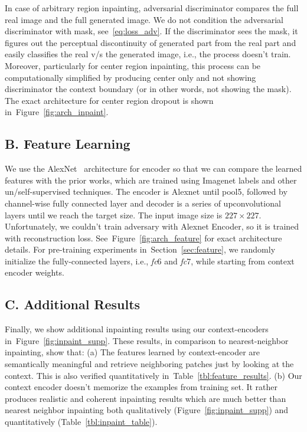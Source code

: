 \documentclass[10pt,twocolumn,letterpaper]{article}
\newcommand{\reffig}[1]{Figure~\ref{fig:#1}}
\newcommand{\refsec}[1]{Section~\ref{sec:#1}}
\newcommand{\reftbl}[1]{Table~\ref{tbl:#1}}
\begin{document}
In case of arbitrary region inpainting, adversarial discriminator compares the full real image and the full generated image. We do not condition the adversarial discriminator with mask, see~\eqref{eq:loss_adv}. If the discriminator sees the mask, it figures out the perceptual discontinuity of generated part from the real part and easily classifies the real v/s the generated image, i.e., the process doesn't train.
%
Moreover, particularly for center region inpainting, this process can be computationally simplified by producing center only and not showing discriminator the context boundary (or in other words, not showing the mask).
The exact architecture for center region dropout is shown in~\reffig{arch_inpaint}.

\subsection*{B. Feature Learning}
We use the AlexNet~\cite{krizhevsky2012imagenet} architecture for encoder so that we can compare the learned features with the prior works, which are trained using Imagenet labels and other un/self-supervised techniques.
The encoder is Alexnet until pool5, followed by channel-wise fully connected layer and decoder is a series of upconvolutional layers until we reach the target size.
The input image size is $227\times 227$.
Unfortunately, we couldn't train adversary with Alexnet Encoder, so it is trained with reconstruction loss.
See~\reffig{arch_feature} for exact architecture details.
For pre-training experiments in~\refsec{feature}, we randomly initialize the fully-connected layers, i.e., \textit{fc}6 and \textit{fc}7, while starting from context encoder weights.

\subsection*{C. Additional Results}
Finally, we show additional inpainting results using our context-encoders in~\reffig{inpaint_supp}.
These results, in comparison to nearest-neighbor inpainting, show that: (a) The features learned by context-encoder are semantically meaningful and retrieve neighboring patches just by looking at the context. This is also verified quantitatively in~\reftbl{feature_results}. (b) Our context encoder doesn't memorize the examples from training set. It rather produces realistic and coherent inpainting results which are much better than nearest neighbor inpainting both qualitatively (\reffig{inpaint_supp}) and quantitatively (\reftbl{inpaint_table}).
\end{document}
